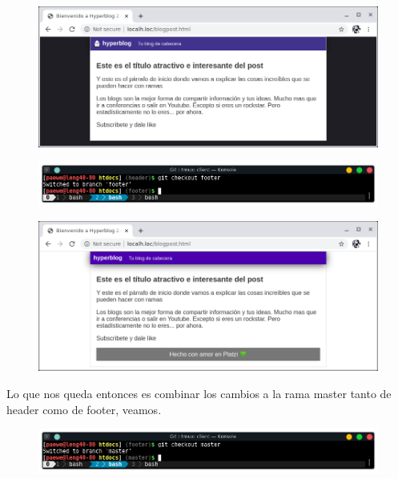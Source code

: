 \documentclass{article}
\begin{document}
\newpage

\begin{figure}[h!]
  \centering
  \includegraphics[scale=0.75]{./Pictures/292_web_header.png}
\end{figure}

\begin{figure}[h!]
  \centering
  \includegraphics[scale=0.75]{./Pictures/293_ch_footer.png}
\end{figure}

\begin{figure}[h!]
  \centering
  \includegraphics[scale=0.75]{./Pictures/294_web_footer.png}
\end{figure}

Lo que nos queda entonces es combinar los cambios a la rama master tanto de
header como de footer, veamos.

\begin{figure}[h!]
  \centering
  \includegraphics[scale=0.75]{./Pictures/295_ch_master.png}
\end{figure}
\end{document}
